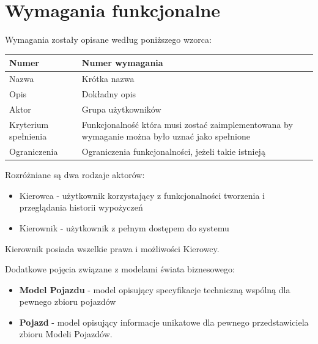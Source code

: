\documentclass[eng,printmode,openany]{mgr}
\begin{document}
\section{Wymagania funkcjonalne}
Wymagania zostały opisane według poniższego wzorca:
\begin{table}[H]
	\begin{tabularx}{\textwidth}{|l|X|}
		\hline
		Numer                & Numer wymagania \\ \hline
		Nazwa                & Krótka nazwa\\ \hline
		Opis                 & Dokładny opis\\ \hline
		Aktor                & Grupa użytkowników\\ \hline
		Kryterium spełnienia & Funkcjonalność która musi zostać zaimplementowana by wymaganie można było uznać jako spełnione\\ \hline
		Ograniczenia         & Ograniczenia funkcjonalności, jeżeli takie istnieją\\ \hline
	\end{tabularx}
\end{table}
Rozróżniane są dwa rodzaje aktorów:
\begin{itemize}
	\item Kierowca - użytkownik korzystający z funkcjonalności tworzenia i przeglądania historii wypożyczeń
	\item Kierownik - użytkownik z pełnym dostępem do systemu
\end{itemize}
Kierownik posiada wszelkie prawa i możliwości Kierowcy.

Dodatkowe pojęcia związane z modelami świata biznesowego:
\begin{itemize}
	\item \textbf{Model Pojazdu} - model opisujący specyfikacje techniczną wspólną dla pewnego zbioru pojazdów
	\item \textbf{Pojazd} - model opisujący informacje unikatowe dla pewnego przedstawiciela zbioru Modeli Pojazdów.
\end{itemize}
\end{document}
